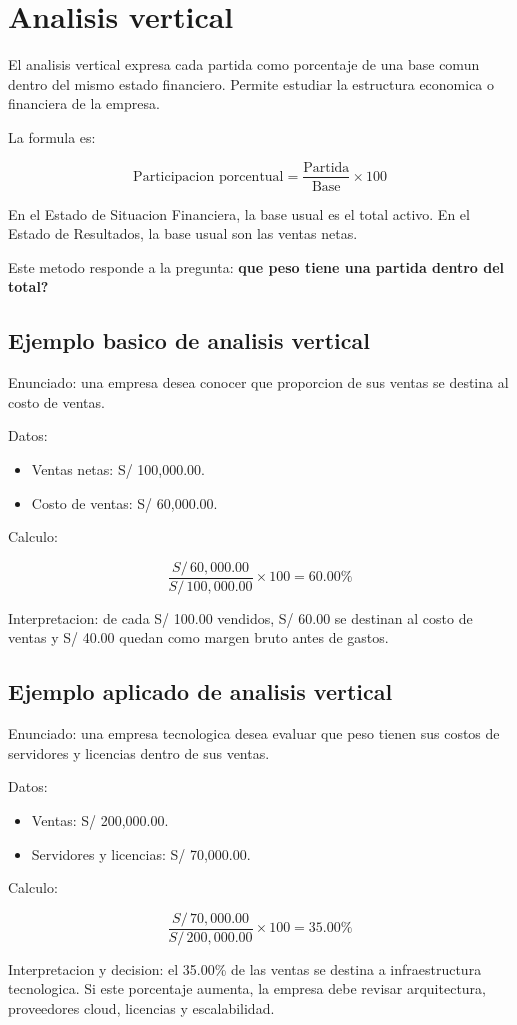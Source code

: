 \section{Analisis vertical}

El analisis vertical expresa cada partida como porcentaje de una base comun dentro del mismo estado financiero. Permite estudiar la estructura economica o financiera de la empresa.

La formula es:

\[
\text{Participacion porcentual} =
\frac{\text{Partida}}{\text{Base}} \times 100
\]

En el Estado de Situacion Financiera, la base usual es el total activo. En el Estado de Resultados, la base usual son las ventas netas.

Este metodo responde a la pregunta: \textbf{que peso tiene una partida dentro del total?}

\subsection{Ejemplo basico de analisis vertical}

Enunciado: una empresa desea conocer que proporcion de sus ventas se destina al costo de ventas.

Datos:

\begin{itemize}
  \item Ventas netas: S/ 100,000.00.
  \item Costo de ventas: S/ 60,000.00.
\end{itemize}

Calculo:

\[
\frac{S/\,60,000.00}{S/\,100,000.00} \times 100 = 60.00\%
\]

Interpretacion: de cada S/ 100.00 vendidos, S/ 60.00 se destinan al costo de ventas y S/ 40.00 quedan como margen bruto antes de gastos.

\subsection{Ejemplo aplicado de analisis vertical}

Enunciado: una empresa tecnologica desea evaluar que peso tienen sus costos de servidores y licencias dentro de sus ventas.

Datos:

\begin{itemize}
  \item Ventas: S/ 200,000.00.
  \item Servidores y licencias: S/ 70,000.00.
\end{itemize}

Calculo:

\[
\frac{S/\,70,000.00}{S/\,200,000.00} \times 100 = 35.00\%
\]

Interpretacion y decision: el 35.00\% de las ventas se destina a infraestructura tecnologica. Si este porcentaje aumenta, la empresa debe revisar arquitectura, proveedores cloud, licencias y escalabilidad.
